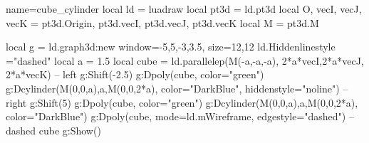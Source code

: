 \documentclass[border=5pt]{standalone}%
\begin{document}
\begin{luadraw}{name=cube_cylinder}
local ld = luadraw
local pt3d = ld.pt3d
local O, vecI, vecJ, vecK = pt3d.Origin, pt3d.vecI, pt3d.vecJ, pt3d.vecK
local M = pt3d.M

local g = ld.graph3d:new{ window={-5,5,-3,3.5}, size={12,12} }
ld.Hiddenlinestyle ="dashed"
local a = 1.5
local cube = ld.parallelep(M(-a,-a,-a), 2*a*vecI,2*a*vecJ, 2*a*vecK)
-- left
g:Shift(-2.5)
g:Dpoly(cube, {color="green"})
g:Dcylinder(M(0,0,a),a,M(0,0,2*a), {color="DarkBlue", hiddenstyle="noline"})
-- right
g:Shift(5)
g:Dpoly(cube, {color="green"})
g:Dcylinder(M(0,0,a),a,M(0,0,2*a), {color="DarkBlue"})
g:Dpoly(cube, {mode=ld.mWireframe, edgestyle="dashed"}) -- dashed cube
g:Show()
\end{luadraw}
\end{document}
